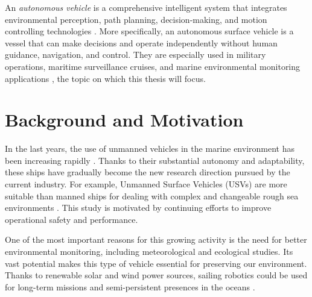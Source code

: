 \label{intro}


An \textit{autonomous vehicle} is a comprehensive intelligent system that integrates environmental perception, path planning, decision-making, and motion controlling technologies \cite{9564580}. More specifically, an autonomous surface vehicle is a vessel that can make decisions and operate independently without human guidance, navigation, and control. They are especially used in military operations, maritime surveillance cruises, and marine environmental monitoring applications \cite{vagale2021path}, the topic on which this thesis will focus. 
\section{Background and Motivation}
In the last years, the use of unmanned vehicles in the marine environment has been increasing rapidly \cite{5152052}. Thanks to their substantial autonomy and adaptability, these ships have gradually become the new research direction pursued by the current industry. For example, Unmanned Surface Vehicles (USVs) are more suitable than manned ships for dealing with complex and changeable rough sea environments \cite{s20020426,vagale2021path}. This study is motivated by continuing efforts to improve operational safety and performance.

One of the most important reasons for this growing activity is the need for better environmental monitoring, including meteorological and ecological studies. Its vast potential makes this type of vehicle essential for preserving our environment.
Thanks to renewable solar and wind power sources, sailing robotics could be used for long-term missions and semi-persistent presences in the oceans \cite{towards}.

